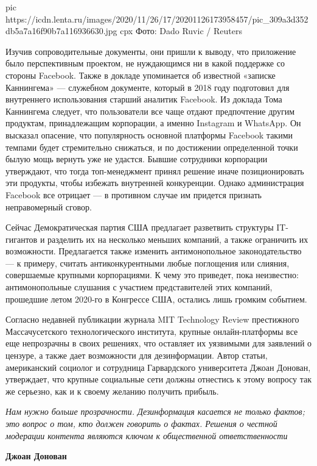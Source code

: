 \ifcmt
pic https://icdn.lenta.ru/images/2020/11/26/17/20201126173958457/pic_309a3d352db5a7a16f90b7a116936630.jpg
cpx Фото: Dado Ruvic / Reuters
\fi

Изучив сопроводительные документы, они пришли к выводу, что приложение было
перспективным проектом, не нуждающимся ни в какой поддержке со стороны
Facebook. Также в докладе упоминается об известной «записке Каннингема» —
служебном документе, который в 2018 году подготовил для внутреннего
использования старший аналитик Facebook. Из доклада Тома Каннингема следует,
что пользователи все чаще отдают предпочтение другим продуктам, принадлежащим
корпорации, а именно Instagram и WhatsApp. Он высказал опасение, что
популярность основной платформы Facebook такими темпами будет стремительно
снижаться, и по достижении определенной точки былую мощь вернуть уже не
удастся. Бывшие сотрудники корпорации утверждают, что тогда топ-менеджмент
принял решение иначе позиционировать эти продукты, чтобы избежать внутренней
конкуренции. Однако администрация Facebook все отрицает — в противном случае им
придется признать неправомерный сговор.

Сейчас Демократическая партия США предлагает разветвить структуры IT-гигантов и
разделить их на несколько меньших компаний, а также ограничить их возможности.
Предлагается также изменить антимонопольное законодательство — к примеру,
считать антиконкурентными любые поглощения или слияния, совершаемые крупными
корпорациями. К чему это приведет, пока неизвестно: антимонопольные слушания с
участием представителей этих компаний, прошедшие летом 2020-го в Конгрессе США,
остались лишь громким событием.

Согласно недавней публикации журнала MIT Technology Review престижного
Массачусетского технологического института, крупные онлайн-платформы все еще
непрозрачны в своих решениях, что оставляет их уязвимыми для заявлений о
цензуре, а также дает возможности для дезинформации. Автор статьи, американский
социолог и сотрудница Гарвардского университета Джоан Донован, утверждает, что
крупные социальные сети должны отнестись к этому вопросу так же серьезно, как и
к своему желанию получить прибыль.

\begin{leftbar}
	\em\large
	Нам нужно больше прозрачности. Дезинформация касается не только фактов; это
				вопрос о том, кто должен говорить о фактах. Решения о честной модерации
				контента являются ключом к общественной ответственности\par
				\textbf{Джоан Донован}
\end{leftbar}

